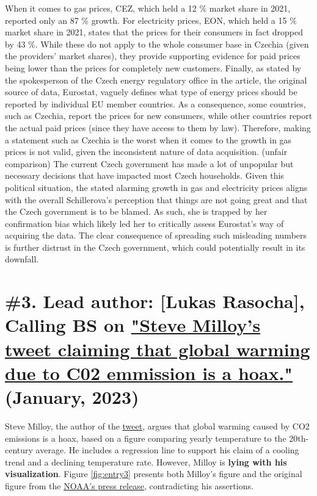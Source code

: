 \documentclass[fleqn,12pt]{article}
\begin{document}
When it comes to gas prices, CEZ, which held a 12 \% market share in 2021, reported only an 87 \% growth.
For electricity prices, EON, which held a 15 \% market share in 2021, states that the prices for their consumers in fact dropped by 43 \%. While these do not apply to the whole 
consumer base in Czechia (given the providers' market shares), they provide supporting evidence for paid prices being lower than the prices for completely new customers.
Finally, as stated by the spokesperson of the Czech energy regulatory office in the article, 
the original source of data, Eurostat, vaguely defines what type of energy prices should be reported by individual EU member countries. 
As a consequence, some countries, such as Czechia, report the prices for new consumers, 
while other countries report the actual paid prices (since they have access to them by law). 
Therefore, making a statement such as Czechia is the worst when it comes to the growth in gas prices is not valid, given the inconsistent nature of data acquisition. (unfair comparison)
The current Czech government has made a lot of unpopular but necessary decisions that have impacted most Czech households. 
Given this political situation, the stated alarming growth in gas and electricity prices aligns with the overall Schillerova's perception that things are not going great and that the 
Czech government is to be blamed. As such, she is trapped by her confirmation bias which likely led her to critically assess Eurostat's way of acquiring the data. The clear consequence of spreading such misleading numbers 
is further distrust in the Czech government, which could potentially result in its downfall.

\newpage

\section{\#3. Lead author: [Lukas Rasocha], Calling BS on \href{https://twitter.com/JunkScience/status/1613724250011242497?s=20}{"Steve Milloy's tweet claiming that global warming due to C02 emmission is a hoax."} (January, 2023)} 

Steve Milloy, the author of the \href{https://twitter.com/JunkScience/status/1613724250011242497?s=20}{tweet}, argues that global warming caused by CO2 emissions is a hoax, 
based on a figure comparing yearly temperature to the 20th-century average. He includes a regression line to support his claim of a cooling trend and a declining temperature rate. 
However, Milloy is \textbf{lying with his visualization}. Figure \ref{fig:entry3} presents both Milloy's figure and the original figure from the \href{https://www.noaa.gov/news/2022-was-worlds-6th-warmest-year-on-record}{NOAA's press release}, 
contradicting his assertions.
\end{document}
